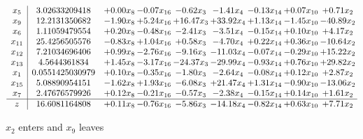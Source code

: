 \documentclass[9pt]{article}
\begin{document}
 \[\begin{array}{c| c c@{\hskip 2pt} c@{\hskip 2pt} c@{\hskip 2pt} c@{\hskip 2pt} c@{\hskip 2pt} c@{\hskip 2pt} c@{\hskip 2pt} }
 x_{5}   &  3.02633209418 & +  0.00 x_{8} & -0.07 x_{16} & -0.62 x_{3} & -1.41 x_{4} & -0.13 x_{14} & +  0.07 x_{10} & +  0.71 x_{2}\\
 x_{9}   &  12.2131350682 & -1.90 x_{8} & +  5.24 x_{16} & + 16.47 x_{3} & + 33.92 x_{4} & +  1.13 x_{14} & -1.45 x_{10} & -40.89 x_{2}\\
 x_{6}   &  1.11059479554 & +  0.20 x_{8} & -0.48 x_{16} & -2.41 x_{3} & -3.51 x_{4} & -0.15 x_{14} & +  0.10 x_{10} & +  4.17 x_{2}\\
 x_{11}   &  25.4256505576 & -0.83 x_{8} & +  1.04 x_{16} & +  0.58 x_{3} & -4.70 x_{4} & +  0.22 x_{14} & +  0.36 x_{10} & -10.64 x_{2}\\
 x_{12}   &  7.21034696406 & +  0.99 x_{8} & -2.76 x_{16} & -9.16 x_{3} & -11.03 x_{4} & -0.07 x_{14} & -0.29 x_{10} & + 15.22 x_{2}\\
 x_{13}   &  4.5644361834 & +  1.45 x_{8} & -3.17 x_{16} & -24.37 x_{3} & -29.99 x_{4} & -0.93 x_{14} & +  0.76 x_{10} & + 29.82 x_{2}\\
 x_{1}   &  0.0551425030979 & +  0.10 x_{8} & -0.35 x_{16} & -1.80 x_{3} & -2.64 x_{4} & -0.08 x_{14} & +  0.12 x_{10} & +  2.87 x_{2}\\
 x_{15}   &  5.08890954151 & -1.62 x_{8} & +  1.93 x_{16} & -6.08 x_{3} & + 21.47 x_{4} & +  1.31 x_{14} & -0.90 x_{10} & -13.06 x_{2}\\
 x_{7}   &  2.47676579926 & +  0.12 x_{8} & -0.21 x_{16} & -0.57 x_{3} & -2.38 x_{4} & -0.15 x_{14} & +  0.14 x_{10} & +  1.61 x_{2}\\
\hline
z    &  16.6081164808 & +  0.11 x_{8} & -0.76 x_{16} & -5.86 x_{3} & -14.18 x_{4} & -0.82 x_{14} & +  0.63 x_{10} & +  7.71 x_{2}\\
\end{array}\]


 $ x_{2} $ enters and $ x_{9} $ leaves 
\end{document}
